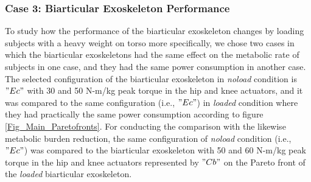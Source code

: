 \documentclass[10pt,letterpaper]{article}
\begin{document}
\subsubsection*{Case 3: Biarticular Exoskeleton Performance}
To study how the performance of the biarticular exoskeleton changes by loading subjects with a heavy weight on torso more specifically, we chose two cases in which the biarticular exoskeletons had the same effect on the metabolic rate of subjects in one case, and they had the same power consumption in another case. The selected configuration of the biarticular exoskeleton in {\it noload} condition is $"Ec"$ with 30 and 50 N-m/kg peak torque in the hip and knee actuators, and it was compared to the same configuration (i.e., $"Ec"$) in  {\it loaded} condition where they had practically the same power consumption according to figure \ref{Fig_Main_Paretofronts}. For conducting the comparison with the likewise metabolic burden reduction, the same configuration of {\it noload} condition (i.e., $"Ec"$) was compared to the biarticular exoskeleton with 50 and 60 N-m/kg peak torque in the hip and knee actuators represented by $"Cb"$ on the Pareto front of the {\it loaded} biarticular exoskeleton.\\
\end{document}
